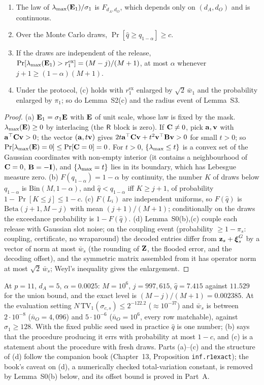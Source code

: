 \begin{proposition}\label{prop:S7}
\begin{enumerate}[nosep,label=(\alph*)]
  \item The law of $\lambda_{\max}(\mathbf{E}_1)/\sigma_1$ is $F_{d_A,d_O}$, which depends only on $(d_A,d_O)$ and is continuous.
  \item Over the Monte Carlo draws, $\Pr[\hat q\ge q_{1-\alpha}]\ge c$.
  \item If the draws are independent of the release, $\Pr[\lambda_{\max}(\mathbf{E}_1)>r_1^{\mathrm{ex}}]=(M-j)/(M+1)$, at most $\alpha$ whenever $j+1\ge(1-\alpha)(M+1)$.
  \item Under the protocol, (c) holds with $r_1^{\mathrm{ex}}$ enlarged by $\sqrt2\,\bar w_1$ and the probability enlarged by $\pi_1$; so do Lemma~S2(c) and the radius event of Lemma~S3.
\end{enumerate}
\end{proposition}
\begin{proof}
(a) $\mathbf{E}_1=\sigma_1\mathbf{E}$ with $\mathbf{E}$ of unit scale, whose law is fixed by the mask. $\lambda_{\max}(\mathbf{E})\ge0$ by interlacing (the $\mathsf{R}$ block is zero). If $\mathbf{C}\ne0$, pick $\mathbf{a},\mathbf{v}$ with $\mathbf{a}^\top\mathbf{C}\mathbf{v}>0$; the vector $(\mathbf{a},t\mathbf{v})$ gives $2t\mathbf{a}^\top\mathbf{C}\mathbf{v}+t^2\mathbf{v}^\top\mathbf{B}\mathbf{v}>0$ for small $t>0$; so $\Pr[\lambda_{\max}(\mathbf{E})=0]\le\Pr[\mathbf{C}=0]=0$. For $t>0$, $\{\lambda_{\max}\le t\}$ is a convex set of the Gaussian coordinates with non-empty interior (it contains a neighbourhood of $\mathbf{C}=0$, $\mathbf{B}=-\mathbf{I}$), and $\{\lambda_{\max}=t\}$ lies in its boundary, which has Lebesgue measure zero. (b) $F(q_{1-\alpha})=1-\alpha$ by continuity, the number $K$ of draws below $q_{1-\alpha}$ is $\mathrm{Bin}(M,1-\alpha)$, and $\hat q<q_{1-\alpha}$ iff $K\ge j+1$, of probability $1-\Pr[K\le j]\le1-c$. (c) $F(L_i)$ are independent uniforms, so $F(\hat q)$ is $\mathrm{Beta}(j+1,M-j)$ with mean $(j+1)/(M+1)$; conditionally on the draws the exceedance probability is $1-F(\hat q)$. (d) Lemma~S0(b),(c) couple each release with Gaussian slot noise; on the coupling event (probability $\ge1-\pi_s$: coupling, certificate, no wraparound) the decoded entries differ from $\mathbf z_s+\boldsymbol{\xi}^G_s$ by a vector of norm at most $\bar w_s$ (the rounding of $\mathbf{Z}$, the flooded error, and the decoding offset), and the symmetric matrix assembled from it has operator norm at most $\sqrt2\,\bar w_s$; Weyl's inequality gives the enlargement.
\end{proof}
At $p=11$, $d_A=5$, $\alpha=0.0025$: $M=10^6$, $j=997{,}615$, $\hat q=7.415$ against $11.529$ for the union bound, and the exact level is $(M-j)/(M+1)=0.002385$. At the evaluation setting $N\,\mathrm{TV}_1(\sigma_{c,s})\le2^{-122.2}$ ($\approx10^{-37}$) and $\bar w_s$ is between $2\cdot10^{-8}$ ($\bar n_O=4{,}096$) and $5\cdot10^{-6}$ ($\bar n_O=10^6$, every row matchable), against $\sigma_1\ge128$. With the fixed public seed used in practice $\hat q$ is one number; (b) says that the procedure producing it errs with probability at most $1-c$, and (c) is a statement about the procedure with fresh draws. Parts (a)--(c) and the structure of (d) follow the companion book (Chapter~13, Proposition \texttt{inf.r1exact}); the book's caveat on (d), a numerically checked total-variation constant, is removed by Lemma~S0(b) below, and its offset bound is proved in Part~A.


